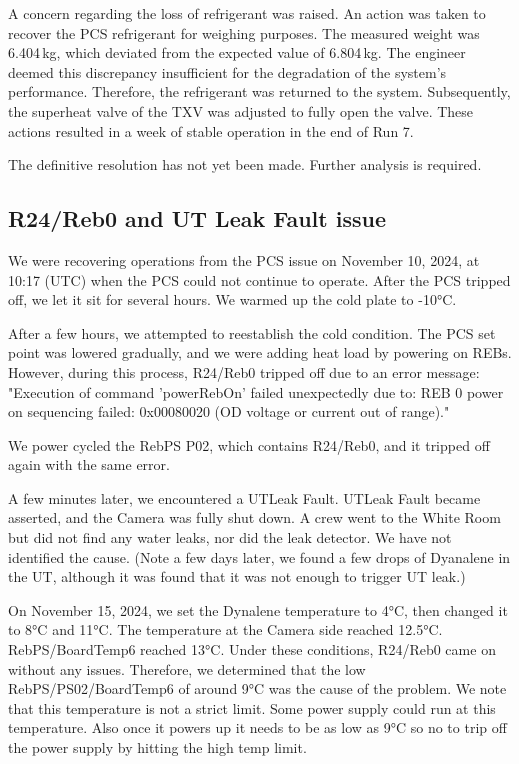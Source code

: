 A concern regarding the loss of refrigerant was raised. An action was taken to recover the PCS refrigerant for weighing purposes. The measured weight was 6.404\,kg, which deviated from the expected value of 6.804\,kg. The engineer deemed this discrepancy insufficient for the degradation of the system's performance. Therefore, the refrigerant was returned to the system. Subsequently, the superheat valve of the TXV was adjusted to fully open the valve. These actions resulted in a week of stable operation in the end of Run 7.

The definitive resolution has not yet been made. Further analysis is required.


\subsection{R24/Reb0 and UT Leak Fault issue}
We were recovering operations from the PCS issue on November 10, 2024, at 10:17 (UTC) when the PCS could not continue to operate. After the PCS tripped off, we let it sit for several hours. We warmed up the cold plate to -10°C.

After a few hours, we attempted to reestablish the cold condition. The PCS set point was lowered gradually, and we were adding heat load by powering on REBs. However, during this process, R24/Reb0 tripped off due to an error message: "Execution of command 'powerRebOn' failed unexpectedly due to: REB 0 power on sequencing failed: 0x00080020 (OD voltage or current out of range)."

We power cycled the RebPS P02, which contains R24/Reb0, and it tripped off again with the same error.

A few minutes later, we encountered a UTLeak Fault. UTLeak Fault became asserted, and the Camera was fully shut down. A crew went to the White Room but did not find any water leaks, nor did the leak detector. We have not identified the cause. (Note a few days later, we found a few drops of Dyanalene in the UT, although it was found that it was not enough to trigger UT leak.)

On November 15, 2024, we set the Dynalene temperature to 4°C, then changed it to 8°C and 11°C. The temperature at the Camera side reached 12.5°C. RebPS/BoardTemp6 reached 13°C. Under these conditions, R24/Reb0 came on without any issues. Therefore, we determined that the low RebPS/PS02/BoardTemp6 of around 9°C was the cause of the problem. We note that this temperature is not a strict limit. Some power supply could run at this temperature. Also once it powers up it needs to be as low as 9°C so no to trip off the power supply by hitting the high temp limit.

